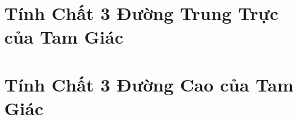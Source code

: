 \documentclass{article}
\begin{document}

\section{Tính Chất 3 Đường Trung Trực của Tam Giác}


\section{Tính Chất 3 Đường Cao của Tam Giác}


\printbibliography[heading=bibintoc]
	
\end{document}
